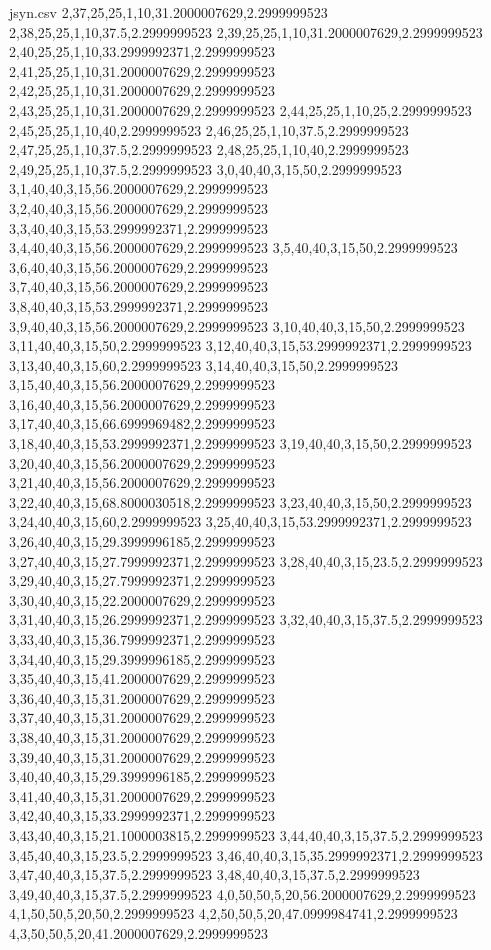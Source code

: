 \begin{filecontents*}{jsyn.csv}
2,37,25,25,1,10,31.2000007629,2.2999999523
2,38,25,25,1,10,37.5,2.2999999523
2,39,25,25,1,10,31.2000007629,2.2999999523
2,40,25,25,1,10,33.2999992371,2.2999999523
2,41,25,25,1,10,31.2000007629,2.2999999523
2,42,25,25,1,10,31.2000007629,2.2999999523
2,43,25,25,1,10,31.2000007629,2.2999999523
2,44,25,25,1,10,25,2.2999999523
2,45,25,25,1,10,40,2.2999999523
2,46,25,25,1,10,37.5,2.2999999523
2,47,25,25,1,10,37.5,2.2999999523
2,48,25,25,1,10,40,2.2999999523
2,49,25,25,1,10,37.5,2.2999999523
3,0,40,40,3,15,50,2.2999999523
3,1,40,40,3,15,56.2000007629,2.2999999523
3,2,40,40,3,15,56.2000007629,2.2999999523
3,3,40,40,3,15,53.2999992371,2.2999999523
3,4,40,40,3,15,56.2000007629,2.2999999523
3,5,40,40,3,15,50,2.2999999523
3,6,40,40,3,15,56.2000007629,2.2999999523
3,7,40,40,3,15,56.2000007629,2.2999999523
3,8,40,40,3,15,53.2999992371,2.2999999523
3,9,40,40,3,15,56.2000007629,2.2999999523
3,10,40,40,3,15,50,2.2999999523
3,11,40,40,3,15,50,2.2999999523
3,12,40,40,3,15,53.2999992371,2.2999999523
3,13,40,40,3,15,60,2.2999999523
3,14,40,40,3,15,50,2.2999999523
3,15,40,40,3,15,56.2000007629,2.2999999523
3,16,40,40,3,15,56.2000007629,2.2999999523
3,17,40,40,3,15,66.6999969482,2.2999999523
3,18,40,40,3,15,53.2999992371,2.2999999523
3,19,40,40,3,15,50,2.2999999523
3,20,40,40,3,15,56.2000007629,2.2999999523
3,21,40,40,3,15,56.2000007629,2.2999999523
3,22,40,40,3,15,68.8000030518,2.2999999523
3,23,40,40,3,15,50,2.2999999523
3,24,40,40,3,15,60,2.2999999523
3,25,40,40,3,15,53.2999992371,2.2999999523
3,26,40,40,3,15,29.3999996185,2.2999999523
3,27,40,40,3,15,27.7999992371,2.2999999523
3,28,40,40,3,15,23.5,2.2999999523
3,29,40,40,3,15,27.7999992371,2.2999999523
3,30,40,40,3,15,22.2000007629,2.2999999523
3,31,40,40,3,15,26.2999992371,2.2999999523
3,32,40,40,3,15,37.5,2.2999999523
3,33,40,40,3,15,36.7999992371,2.2999999523
3,34,40,40,3,15,29.3999996185,2.2999999523
3,35,40,40,3,15,41.2000007629,2.2999999523
3,36,40,40,3,15,31.2000007629,2.2999999523
3,37,40,40,3,15,31.2000007629,2.2999999523
3,38,40,40,3,15,31.2000007629,2.2999999523
3,39,40,40,3,15,31.2000007629,2.2999999523
3,40,40,40,3,15,29.3999996185,2.2999999523
3,41,40,40,3,15,31.2000007629,2.2999999523
3,42,40,40,3,15,33.2999992371,2.2999999523
3,43,40,40,3,15,21.1000003815,2.2999999523
3,44,40,40,3,15,37.5,2.2999999523
3,45,40,40,3,15,23.5,2.2999999523
3,46,40,40,3,15,35.2999992371,2.2999999523
3,47,40,40,3,15,37.5,2.2999999523
3,48,40,40,3,15,37.5,2.2999999523
3,49,40,40,3,15,37.5,2.2999999523
4,0,50,50,5,20,56.2000007629,2.2999999523
4,1,50,50,5,20,50,2.2999999523
4,2,50,50,5,20,47.0999984741,2.2999999523
4,3,50,50,5,20,41.2000007629,2.2999999523

\end{filecontents*}
